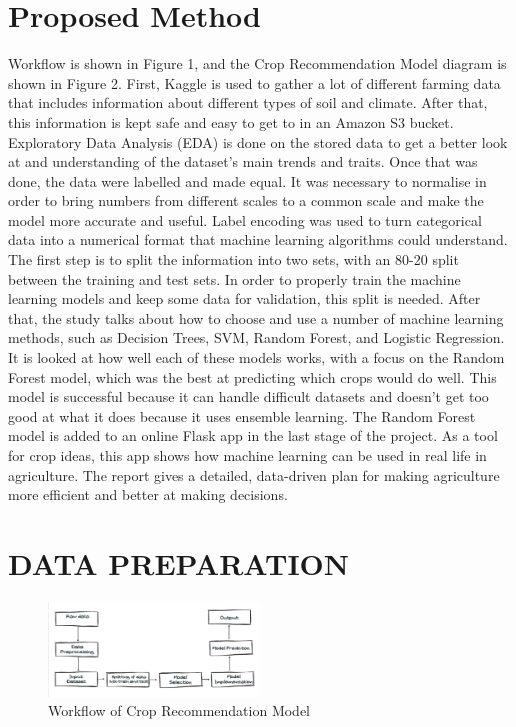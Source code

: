 \section{Proposed Method}

Workflow is shown in Figure 1, and the Crop Recommendation Model diagram is shown in Figure 2.  First, Kaggle is used to gather a lot of different farming data that includes information about different types of soil and climate. After that, this information is kept safe and easy to get to in an Amazon S3 bucket. Exploratory Data Analysis (EDA) is done on the stored data to get a better look at and understanding of the dataset's main trends and traits. Once that was done, the data were labelled and made equal. It was necessary to normalise in order to bring numbers from different scales to a common scale and make the model more accurate and useful. Label encoding was used to turn categorical data into a numerical format that machine learning algorithms could understand. The first step is to split the information into two sets, with an 80-20 split between the training and test sets. In order to properly train the machine learning models and keep some data for validation, this split is needed. After that, the study talks about how to choose and use a number of machine learning methods, such as Decision Trees, SVM, Random Forest, and Logistic Regression. It is looked at how well each of these models works, with a focus on the Random Forest model, which was the best at predicting which crops would do well. This model is successful because it can handle difficult datasets and doesn't get too good at what it does because it uses ensemble learning. The Random Forest model is added to an online Flask app in the last stage of the project. As a tool for crop ideas, this app shows how machine learning can be used in real life in agriculture. The report gives a detailed, data-driven plan for making agriculture more efficient and better at making decisions.
\section{DATA PREPARATION}
\begin{figure}[h]
    \centering
    \includegraphics[width=0.5\textwidth]{BLOCK DIAGRAM.png}
    \caption{Workflow of Crop Recommendation Model}
    \label{fig:my_label}
    
\end{figure}

